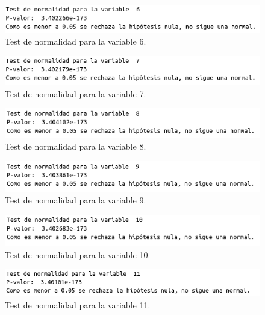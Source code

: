 \documentclass[12pt,a4paper]{article}
\begin{document}
\begin{figure}[H]
	\centering
	\includegraphics[scale=0.65]{./Imagenes/EDA/Regresion/test_normalidad6.png}
	\caption{Test de normalidad para la variable 6.}
\end{figure}

\begin{figure}[H]
	\centering
	\includegraphics[scale=0.65]{./Imagenes/EDA/Regresion/test_normalidad7.png}
	\caption{Test de normalidad para la variable 7.}
\end{figure}

\begin{figure}[H]
	\centering
	\includegraphics[scale=0.65]{./Imagenes/EDA/Regresion/test_normalidad8.png}
	\caption{Test de normalidad para la variable 8.}
\end{figure}

\begin{figure}[H]
	\centering
	\includegraphics[scale=0.65]{./Imagenes/EDA/Regresion/test_normalidad9.png}
	\caption{Test de normalidad para la variable 9.}
\end{figure}

\begin{figure}[H]
	\centering
	\includegraphics[scale=0.65]{./Imagenes/EDA/Regresion/test_normalidad10.png}
	\caption{Test de normalidad para la variable 10.}
\end{figure}

\begin{figure}[H]
	\centering
	\includegraphics[scale=0.65]{./Imagenes/EDA/Regresion/test_normalidad11.png}
	\caption{Test de normalidad para la variable 11.}
\end{figure}
\end{document}
